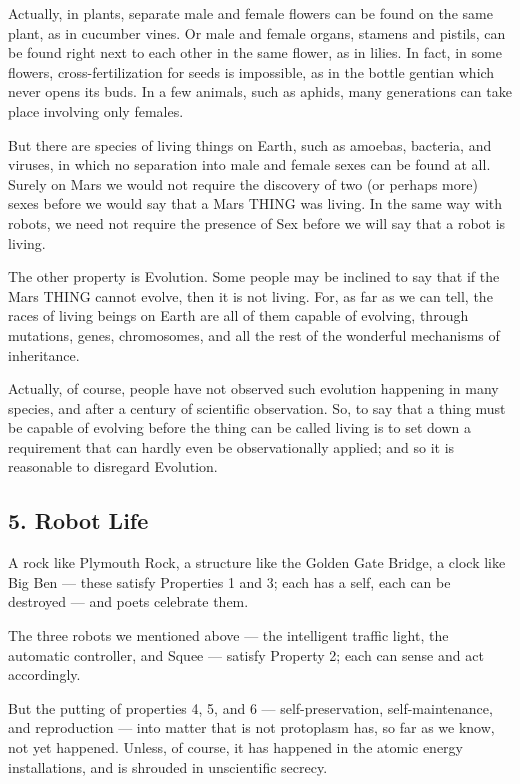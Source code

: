 \documentclass[11pt]{article}
\begin{document}
Actually, in plants, separate male and female flowers can be found on the same
plant, as in cucumber vines. Or male and female organs, stamens and pistils,
can be found right next to each other in the same flower, as in lilies. In
fact, in some flowers, cross-fertilization for seeds is impossible, as in the
bottle gentian which never opens its buds. In a few animals, such as aphids,
many generations can take place involving only females.

But there are species of living things on Earth, such as amoebas, bacteria, and
viruses, in which no separation into male and female sexes can be found at all.
Surely on Mars we would not require the discovery of two (or perhaps more)
sexes before we would say that a Mars THING was living. In the same way with
robots, we need not require the presence of Sex before we will say that a robot
is living.

The other property is Evolution. Some people may be inclined to say that if the
Mars THING cannot evolve, then it is not living. For, as far as we can tell,
the races of living beings on Earth are all of them capable of evolving,
through mutations, genes, chromosomes, and all the rest of the wonderful
mechanisms of inheritance.

Actually, of course, people have not observed such evolution happening in many
species, and after a century of scientific observation. So, to say that a thing
must be capable of evolving before the thing can be called living is to set
down a requirement that can hardly even be observationally applied; and so it
is reasonable to disregard Evolution.

\subsection*{5. Robot Life}

A rock like Plymouth Rock, a structure like the Golden Gate Bridge, a clock
like Big Ben --- these satisfy Properties 1 and 3; each has a self, each can
be destroyed --- and poets celebrate them.

The three robots we mentioned above --- the intelligent traffic light, the
automatic controller, and Squee --- satisfy Property 2; each can sense and act
accordingly.

But the putting of properties 4, 5, and 6 --- self-preservation,
self-maintenance, and reproduction --- into matter that is not protoplasm has,
so far as we know, not yet happened. Unless, of course, it has happened in the
atomic energy installations, and is shrouded in unscientific secrecy.
\end{document}
